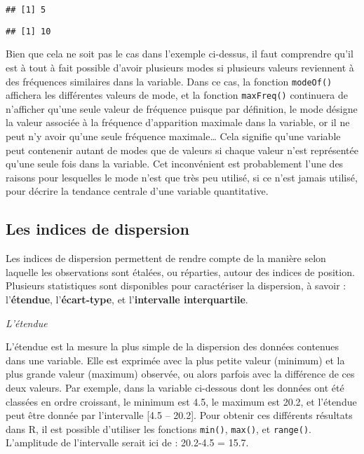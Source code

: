 \documentclass[
  french,
]{book}
\newenvironment{Shaded}{\begin{snugshade}}{\end{snugshade}}
\newcommand{\CommentTok}[1]{\textcolor[rgb]{0.56,0.35,0.01}{\textit{#1}}}
\newcommand{\DataTypeTok}[1]{\textcolor[rgb]{0.13,0.29,0.53}{#1}}
\newcommand{\KeywordTok}[1]{\textcolor[rgb]{0.13,0.29,0.53}{\textbf{#1}}}
\newcommand{\NormalTok}[1]{#1}
\newcommand{\OperatorTok}[1]{\textcolor[rgb]{0.81,0.36,0.00}{\textbf{#1}}}
\begin{document}
\begin{verbatim}
## [1] 5
\end{verbatim}

\begin{Shaded}
\end{Shaded}

\begin{verbatim}
## [1] 10
\end{verbatim}

Bien que cela ne soit pas le cas dans l'exemple ci-dessus, il faut comprendre qu'il est à tout à fait possible d'avoir plusieurs modes si plusieurs valeurs reviennent à des fréquences similaires dans la variable. Dans ce cas, la fonction \texttt{modeOf()} affichera les différentes valeurs de mode, et la fonction \texttt{maxFreq()} continuera de n'afficher qu'une seule valeur de fréquence puisque par définition, le mode désigne la valeur associée à la fréquence d'apparition maximale dans la variable, or il ne peut n'y avoir qu'une seule fréquence maximale\ldots{} Cela signifie qu'une variable peut contenenir autant de modes que de valeurs si chaque valeur n'est représentée qu'une seule fois dans la variable. Cet inconvénient est probablement l'une des raisons pour lesquelles le mode n'est que très peu utilisé, si ce n'est jamais utilisé, pour décrire la tendance centrale d'une variable quantitative.

\hypertarget{les-indices-de-dispersion}{%
\subsection{Les indices de dispersion}\label{les-indices-de-dispersion}}

Les indices de dispersion permettent de rendre compte de la manière selon laquelle les observations sont étalées, ou réparties, autour des indices de position. Plusieurs statistiques sont disponibles pour caractériser la dispersion, à savoir : l'\textbf{étendue}, l'\textbf{écart-type}, et l'\textbf{intervalle interquartile}.

\emph{L'étendue}

L'étendue est la mesure la plus simple de la dispersion des données contenues dans une variable. Elle est exprimée avec la plus petite valeur (minimum) et la plus grande valeur (maximum) observée, ou alors parfois avec la différence de ces deux valeurs. Par exemple, dans la variable ci-dessous dont les données ont été classées en ordre croissant, le minimum est 4.5, le maximum est 20.2, et l'étendue peut être donnée par l'intervalle {[}4.5 -- 20.2{]}. Pour obtenir ces différents résultats dans R, il est possible d'utiliser les fonctions \texttt{min()}, \texttt{max()}, et \texttt{range()}. L'amplitude de l'intervalle serait ici de : 20.2-4.5 = 15.7.
\end{document}
